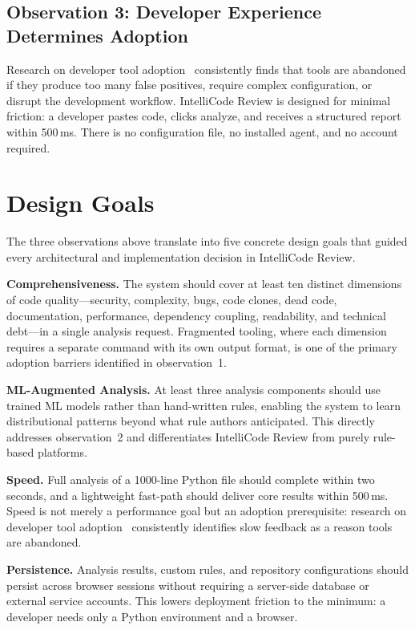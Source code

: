 \documentclass[12pt, oneside]{report}
\begin{document}
\subsection{Observation 3: Developer Experience Determines Adoption}

Research on developer tool adoption~\cite{johnson2013} consistently finds that tools are
abandoned if they produce too many false positives, require complex configuration, or
disrupt the development workflow. IntelliCode Review is designed for minimal friction: a
developer pastes code, clicks analyze, and receives a structured report within 500\,ms.
There is no configuration file, no installed agent, and no account required.

\section{Design Goals}
\label{sec:goals}

The three observations above translate into five concrete design goals that guided every
architectural and implementation decision in IntelliCode Review.

\textbf{Comprehensiveness.} The system should cover at least ten distinct dimensions
of code quality---security, complexity, bugs, code clones, dead code, documentation,
performance, dependency coupling, readability, and technical debt---in a single
analysis request. Fragmented tooling, where each dimension requires a separate command
with its own output format, is one of the primary adoption barriers identified in
observation~1.

\textbf{ML-Augmented Analysis.} At least three analysis components should use trained
ML models rather than hand-written rules, enabling the system to learn distributional
patterns beyond what rule authors anticipated. This directly addresses observation~2 and
differentiates IntelliCode Review from purely rule-based platforms.

\textbf{Speed.} Full analysis of a 1000-line Python file should complete within two
seconds, and a lightweight fast-path should deliver core results within 500\,ms. Speed
is not merely a performance goal but an adoption prerequisite: research on developer
tool adoption~\cite{johnson2013} consistently identifies slow feedback as a reason tools
are abandoned.

\textbf{Persistence.} Analysis results, custom rules, and repository configurations
should persist across browser sessions without requiring a server-side database or
external service accounts. This lowers deployment friction to the minimum: a developer
needs only a Python environment and a browser.
\end{document}

